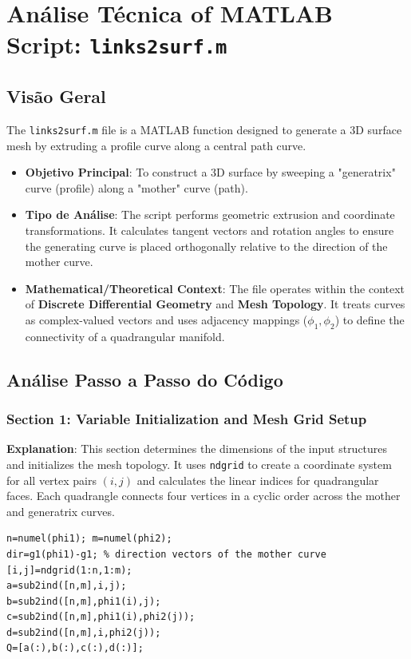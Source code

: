 
\chapter{Análise Técnica of MATLAB Script: \texttt{links2surf.m}}
\section{Visão Geral}

The \texttt{links2surf.m} file is a MATLAB function designed to generate a 3D surface mesh by extruding a profile curve along a central path curve.

\begin{itemize}
    \item \textbf{Objetivo Principal}: To construct a 3D surface by sweeping a "generatrix" curve (profile) along a "mother" curve (path).
    \item \textbf{Tipo de Análise}: The script performs geometric extrusion and coordinate transformations. It calculates tangent vectors and rotation angles to ensure the generating curve is placed orthogonally relative to the direction of the mother curve.
    \item \textbf{Mathematical/Theoretical Context}: The file operates within the context of \textbf{Discrete Differential Geometry} and \textbf{Mesh Topology}. It treats curves as complex-valued vectors and uses adjacency mappings ($\phi_1, \phi_2$) to define the connectivity of a quadrangular manifold.
\end{itemize}

\section{Análise Passo a Passo do Código}

\subsection{Section 1: Variable Initialization and Mesh Grid Setup}
\textbf{Explanation}: This section determines the dimensions of the input structures and initializes the mesh topology. It uses 
\texttt{ndgrid} to create a coordinate system for all vertex pairs $(i, j)$ and calculates the linear indices for quadrangular faces. Each quadrangle connects four vertices in a cyclic order across the mother and generatrix curves.

\begin{lstlisting}
n=numel(phi1); m=numel(phi2);
dir=g1(phi1)-g1; % direction vectors of the mother curve
[i,j]=ndgrid(1:n,1:m);
a=sub2ind([n,m],i,j);
b=sub2ind([n,m],phi1(i),j);
c=sub2ind([n,m],phi1(i),phi2(j));
d=sub2ind([n,m],i,phi2(j));
Q=[a(:),b(:),c(:),d(:)];
\end{lstlisting}


